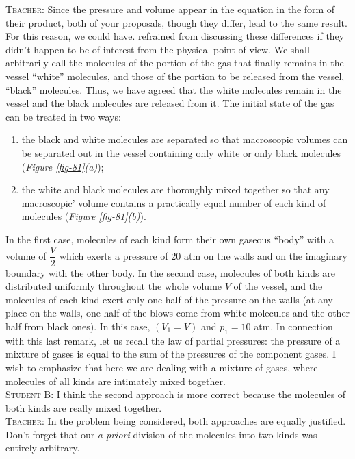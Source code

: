 \documentclass[a4paper,sfsidenotes]{tufte-book}
\begin{document}
\textsc{Teacher:} Since the pressure and volume appear in the equation in the form of their product, both of your proposals, though they differ, lead to the same result. For this reason, we could have. refrained from discussing these differences if they didn't happen to be of interest from the physical
point of view. We shall arbitrarily call the molecules of the portion of the gas that finally remains in the vessel ``white'' molecules, and those of the portion to be released from the vessel, ``black'' molecules. Thus, we have agreed that the white molecules remain in the vessel and the black molecules are released from it. The initial state of the gas can be treated in two ways: 
\begin{enumerate}
\item the black and white molecules are separated so that macroscopic volumes can be separated out in the vessel containing only white or only black molecules (\emph{Figure \ref{fig-81}(a)}); 
\item the white and black molecules are thoroughly mixed together so that any macroscopic' volume contains a practically equal number of each kind of molecules (\emph{Figure \ref{fig-81}(b)}). 
\end{enumerate}

In the first case, molecules of each kind form their own gaseous ``body'' with a volume of $\dfrac{V}{2}$ which exerts a pressure of 20 atm on the walls and on the imaginary boundary with the other body. In the second case, molecules of both kinds are distributed uniformly throughout the whole volume $V$ of the vessel, and the molecules of each kind exert only one half of the pressure on the walls (at any place on the walls, one half of the blows come from white molecules and the other half from black ones). In this case, $(V_{1}=V)$ and $p_{1}=10$ atm. In connection with this last remark, let us recall the law of partial pressures: the pressure of a mixture of gases is equal to the sum of the pressures of the component gases. I wish to emphasize that here we are dealing with a mixture of gases, where molecules of all kinds are intimately mixed together.
\\
\textsc{Student B:} I think the second approach is more correct because the molecules of both kinds are really mixed together.
\\
\textsc{Teacher:} In the problem being considered, both approaches are equally justified. Don't forget that our \emph{a priori} division of the molecules into two kinds was entirely arbitrary. 
\end{document}
